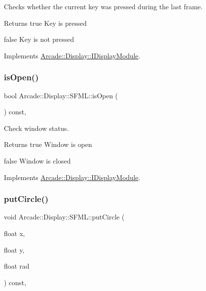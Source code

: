 Checks whether the current key was pressed during the last frame. 

\begin{DoxyReturn}{Returns}
true Key is pressed 

false Key is not pressed 
\end{DoxyReturn}


Implements \mbox{\hyperlink{classArcade_1_1Display_1_1IDisplayModule_ac347fc77c01e12c5ce23be99d357008d}{Arcade\+::\+Display\+::\+I\+Display\+Module}}.

\mbox{\label{classArcade_1_1Display_1_1SFML_a77be7097a8ed969dcf1fca6f960d0c4c}} 
\subsubsection{\texorpdfstring{isOpen()}{isOpen()}}
{\footnotesize\ttfamily bool Arcade\+::\+Display\+::\+S\+F\+M\+L\+::is\+Open (\begin{DoxyParamCaption}{ }\end{DoxyParamCaption}) const\hspace{0.3cm}{\ttfamily [final]}, {\ttfamily [virtual]}}



Check window status. 

\begin{DoxyReturn}{Returns}
true Window is open 

false Window is closed 
\end{DoxyReturn}


Implements \mbox{\hyperlink{classArcade_1_1Display_1_1IDisplayModule_a34c86dd2e7aa60a70c0cc06ccbd34e47}{Arcade\+::\+Display\+::\+I\+Display\+Module}}.

\mbox{\label{classArcade_1_1Display_1_1SFML_a46143388a143114f2513a408d2237d7c}} 
\subsubsection{\texorpdfstring{putCircle()}{putCircle()}}
{\footnotesize\ttfamily void Arcade\+::\+Display\+::\+S\+F\+M\+L\+::put\+Circle (\begin{DoxyParamCaption}\item[{float}]{x,  }\item[{float}]{y,  }\item[{float}]{rad }\end{DoxyParamCaption}) const\hspace{0.3cm}{\ttfamily [final]}, {\ttfamily [virtual]}}



